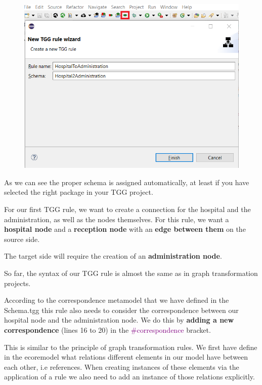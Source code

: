 \begin{figure}[h]
    \centering
    \includegraphics[scale=0.5 ]{pictures/tgg_rule_creation.png}
    \caption{}
    \label{TGG rule creation}
\end{figure}

As we can see the proper schema is assigned automatically, at least if you have selected the right package in your TGG project.\newline

For our first TGG rule, we want to create a connection for the hospital and the administration, as well as the nodes themselves. For this rule, we want a \textbf{hospital node} and a \textbf{reception node} with an \textbf{edge between them} on the source side.

The target side will require the creation of an \textbf{administration node}.

So far, the syntax of our TGG rule is almost the same as in graph transformation projects.\newline

According to the correspondence metamodel that we have defined in the Schema.tgg this rule also needs to consider the correspondence between our hospital node and the administration node. We do this by \textbf{adding a new correspondence} (lines 16 to 20) in the \textcolor{Purple}{\#correspondence} bracket.

This is similar to the principle of graph transformation rules. We first have define in the ecoremodel what relations different elements in our model have between each other, i.e references.
When creating instances of these elements via the application of a rule we also need to add an instance of those relations explicitly.

